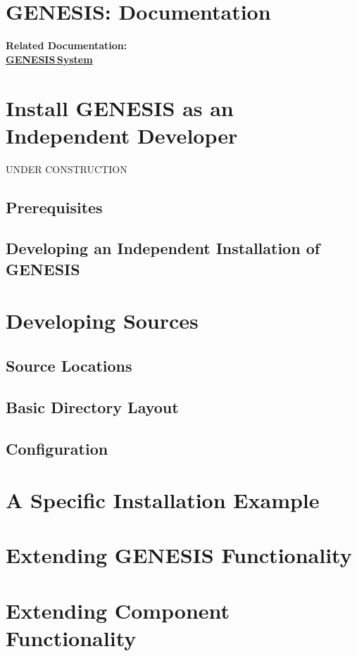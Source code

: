 \documentclass[12pt]{article}
\begin{document}
\section*{GENESIS: Documentation}

{\bf Related Documentation:} \\
\href{../genesis-system/genesis-system.tex}{\bf GENESIS\,System}

\section*{Install GENESIS as an Independent Developer}

UNDER CONSTRUCTION

\subsection*{Prerequisites}

\subsection*{Developing an Independent Installation of GENESIS}

\section*{Developing Sources}

\subsection*{Source Locations}

\subsection*{Basic Directory Layout}

\subsection*{Configuration}

\section*{A Specific Installation Example}

\section*{Extending GENESIS Functionality}

\section*{Extending Component Functionality}
\end{document}
